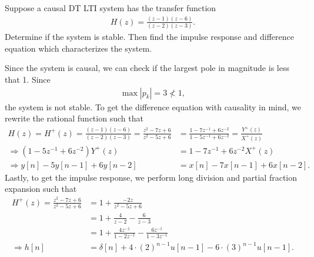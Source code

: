 \documentclass{report}
\begin{document}
\begin{example}
    Suppose a causal DT LTI system has the transfer function
    \begin{align*}
        H(z) = \frac{(z-1)(z-6)}{(z-2)(z-3)}.
    \end{align*}
    Determine if the system is stable. Then find the impulse response and difference equation which characterizes the system. 
\end{example}
\begin{solution}
    Since the system is causal, we can check if the largest pole in magnitude is less that 1. Since 
    \begin{align*}
        \max|p_k| = 3 \nless 1,
    \end{align*}
    the system is not stable. To get the difference equation with causality in mind, we rewrite the rational function such that
    \begin{align*}
        H(z) = H^+(z) = \frac{(z-1)(z-6)}{(z-2)(z-3)} = \frac{z^2-7z+6}{z^2-5z+6} &= \frac{1-7z^{-1}+6z^{-2}}{1-5z^{-1}+6z^{-2}} = \frac{Y^+(z)}{X^+(z)} \\
        \Longrightarrow (1-5z^{-1}+6z^{-2})Y^+(z) &= 1-7z^{-1}+6z^{-2}X^+(z) \\[0.25cm]
        \Longrightarrow y[n]-5y[n-1]+6y[n-2] &= x[n]-7x[n-1]+6x[n-2].
    \end{align*}
    Lastly, to get the impulse response, we perform long division and partial fraction expansion such that 
    \begin{align*}
        H^+(z) = \frac{z^2-7z+6}{z^2-5z+6} &= 1 + \frac{-2z}{z^2-5z+6} \\ 
        &= 1 + \frac{4}{z-2} - \frac{6}{z-3} \\
        &= 1 + \frac{4z^{-1}}{1-2z^{-1}} - \frac{6z^{-1}}{1-3z^{-1}} \\[0.25cm]
        \Longrightarrow h[n] &= \delta[n] + 4\cdot(2)^{n-1} u[n-1] - 6\cdot(3)^{n-1} u[n-1].
    \end{align*}
\end{solution}
\end{document}
